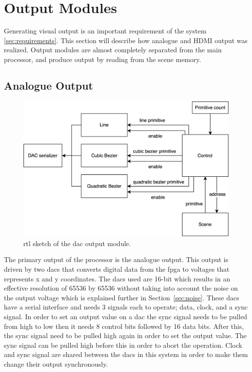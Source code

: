 \chapter{Output Modules}
\label{chap:Output}

Generating visual output is an important requirement of the system \ref{sec:requirements}.
This section will describe how analogue and HDMI output was realized.
Output modules are almost completely separated from the main processor, and produce output by reading from the scene memory.

\section{Analogue Output}

\begin{figure}[h!]
    \includegraphics[width=\linewidth]{images/dac-output.png}
    \caption{\gls{rtl} sketch of the \vthreek \gls{dac} output module.}
    \label{fig:dac-output}
\end{figure}

The primary output of the processor is the analogue output.
This output is driven by two \gls{dac}s that converts digital data from the \gls{fpga} to voltages that represents x and y coordinates.
The \gls{dac}s used are 16-bit which results in an effective resolution of 65536 by 65536 without taking into account the noise on the output voltage which is explained further in Section~\ref{sec:noise}.
These \gls{dac}s have a serial interface and needs 3 signals each to operate; data, clock, and a sync signal.
In order to set an output value on a \gls{dac} the sync signal needs to be pulled from high to low then it needs 8 control bits followed by 16 data bits.
After this, the sync signal need to be pulled high again in order to set the output value.
The sync signal can be pulled high before this in order to abort the operation.
Clock and sync signal are shared between the \gls{dac}s in this system in order to make them change their output synchronously.

